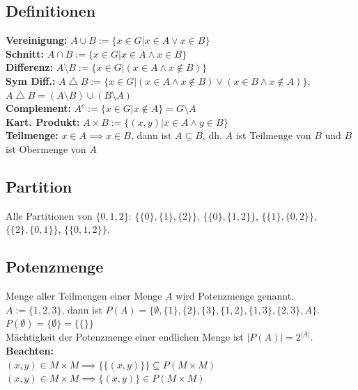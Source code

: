 \documentclass[8pt,landscape]{scrartcl}
\begin{document}
\begin{multicols}{3}
\subsection{Definitionen}
\textbf{Vereinigung:} $A \cup B := \{ x \in G | x \in A \lor x \in B \}$\\
\textbf{Schnitt:}     $A \cap B := \{ x \in G | x \in A \land x \in B \}$\\
\textbf{Differenz:}   $A \setminus B := \{x \in G | (x \in A \land x \not\in B) \}$\\
\textbf{Sym Diff.:}   $A \bigtriangleup B := \{x \in G | (x \in A \land x \not \in B) \lor (x \in B \land x \not \in A) \}$, $A \bigtriangleup B = (A \setminus B) \cup (B \setminus A)$ \\
\textbf{Complement:}  $A^c := \{x \in G | x \not \in A \} = G \setminus A$\\
\textbf{Kart. Produkt:} $A \times B := \{ (x, y) | x \in A \land y \in B \}$\\
\textbf{Teilmenge:} $x \in A \implies x \in B$, dann ist $A \subseteq B$, dh. $A$ ist Teilmenge von $B$ und $B$ ist Obermenge von $A$





\subsection{Partition}
Alle Partitionen von $\{0, 1, 2\}$:
$\{ \{0\}, \{1\}, \{2\} \}$, $\{ \{0\}, \{1, 2\} \}$, $\{ \{1\}, \{0, 2\} \}$, $\{ \{2\}, \{0, 1\} \}$, $\{ \{0, 1, 2\} \}$.


\subsection{Potenzmenge}
Menge aller Teilmengen einer Menge $A$ wird Potenzmenge genannt.\\
$A := \{ 1, 2, 3 \}$, dann ist $P(A) = \{ \emptyset, \{1\}, \{2\}, \{3\}, \{1, 2\}, \{1, 3\}, \{2, 3\}, A\}$.\\
$P(\emptyset) = \{ \emptyset \} = \{ \{ \} \}$\\
M\"achtigkeit der Potenzmenge einer endlichen Menge ist $\left|P(A)\right| = 2^{|A|}$.\\
\textbf{Beachten:}\\
$(x, y) \in M \times M \implies \{ \{ (x, y) \} \} \subseteq P(M \times M)$\\
$(x, y) \in M \times M \implies \{ (x, y) \} \in P(M \times M)$







\end{multicols}
\end{document}
